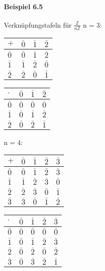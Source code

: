 \documentclass[a4paper]{scrartcl}
\theoremstyle{definition}
\theoremstyle{plain}
\theoremstyle{plain}
\theoremstyle{remark}
\theoremstyle{remark}
\theoremstyle{remark}
\theoremstyle{remark}
\theoremstyle{remark}
\begin{document}
\paragraph{Beispiel 6.5}
\label{sec-3-2-4-2}
Verknüpfungstafeln für $\frac{\mathbb{Z}}{n\mathbb{Z}}$
n = 3:
\begin{center}
\begin{tabular}{llll}
$+$ & $\bar 0$ & $\bar 1$ & $\bar 2$\\
\hline
$\bar 0$ & $\bar 0$ & $\bar 1$ & $\bar 2$\\
$\bar 1$ & $\bar 1$ & $\bar 2$ & $\bar 0$\\
$\bar 2$ & $\bar 2$ & $\bar 0$ & $\bar 1$\\
\end{tabular}
\end{center}

\begin{center}
\begin{tabular}{llll}
$\cdot$ & $\bar 0$ & $\bar 1$ & $\bar 2$\\
\hline
$\bar 0$ & $\bar 0$ & $\bar 0$ & $\bar 0$\\
$\bar 1$ & $\bar 0$ & $\bar 1$ & $\bar 2$\\
$\bar 2$ & $\bar 0$ & $\bar 2$ & $\bar 1$\\
\end{tabular}
\end{center}
n = 4:
\begin{center}
\begin{tabular}{lllll}
$+$ & $\bar 0$ & $\bar 1$ & $\bar 2$ & $\bar 3$\\
\hline
$\bar 0$ & $\bar 0$ & $\bar 1$ & $\bar 2$ & $\bar 3$\\
$\bar 1$ & $\bar 1$ & $\bar 2$ & $\bar 3$ & $\bar 0$\\
$\bar 2$ & $\bar 2$ & $\bar 3$ & $\bar 0$ & $\bar 1$\\
$\bar 3$ & $\bar 3$ & $\bar 0$ & $\bar 1$ & $\bar 2$\\
\end{tabular}
\end{center}

\begin{center}
\begin{tabular}{lllll}
$\cdot$ & $\bar 0$ & $\bar 1$ & $\bar 2$ & $\bar 3$\\
\hline
$\bar 0$ & $\bar 0$ & $\bar 0$ & $\bar 0$ & $\bar 0$\\
$\bar 1$ & $\bar 0$ & $\bar 1$ & $\bar 2$ & $\bar 3$\\
$\bar 2$ & $\bar 0$ & $\bar 2$ & $\bar 0$ & $\bar 2$\\
$\bar 3$ & $\bar 0$ & $\bar 3$ & $\bar 2$ & $\bar 1$\\
\end{tabular}
\end{center}
\end{document}
